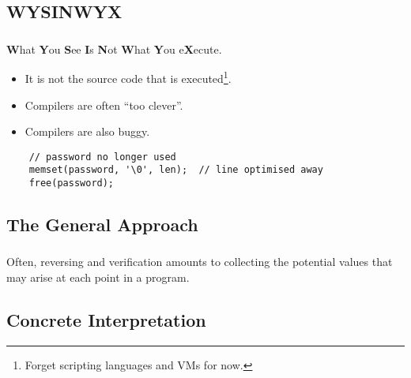 \documentclass[compress]{beamer}
\begin{document}
\subsection{WYSINWYX}
\begin{frame}[fragile]
	\frametitle{\insertsubsection}

	\textbf{\Large W}hat \textbf{\Large Y}ou \textbf{\Large S}ee \textbf{\Large I}s \textbf{\Large N}ot \textbf{\Large W}hat \textbf{\Large Y}ou e\textbf{\Large X}ecute.
	\vfill

	\begin{itemize}
		\item It is not the source code that is executed\footnote{Forget scripting languages and VMs for now.}.
		\item Compilers are often ``too clever''.
		\item Compilers are also buggy.
	\end{itemize}
	\vfill

	\begin{lstlisting}
	// password no longer used
	memset(password, '\0', len);  // line optimised away
	free(password);
	\end{lstlisting}
	\vfill


\end{frame}

\subsection{The General Approach}
\begin{frame}[fragile]
	\frametitle{\insertsubsection}

        Often, reversing and verification amounts to collecting the
        potential values that may arise at each point in a program.
\end{frame}

\subsection{Concrete Interpretation}
\end{document}
